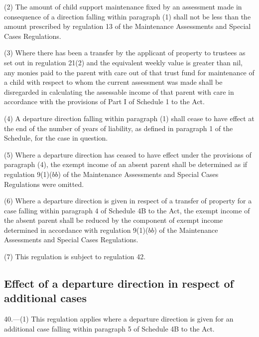 \documentclass[12pt,a4paper]{article}
\begin{document}
(2) The amount of child support maintenance fixed by an assessment made in
consequence of a direction falling within paragraph (1) shall not be less than
the amount prescribed by regulation 13 of the Maintenance Assessments and
Special Cases Regulations.

(3) Where there has been a transfer by the applicant of property to trustees as
set out in regulation 21(2) and the equivalent weekly value is greater than nil,
any monies paid to the parent with care out of that trust fund for maintenance
of a child with respect to whom the current assessment was made shall be
disregarded in calculating the assessable income of that parent with care in
accordance with the provisions of Part I of Schedule 1 to the Act.

(4) A departure direction falling within paragraph (1) shall cease to have
effect at the end of the number of years of liability, as defined in paragraph 1
of the Schedule, for the case in question.

(5) Where a departure direction has ceased to have effect under the provisions
of paragraph (4), the exempt income of an absent parent shall be determined as
if regulation 9(1)($bb$) of the Maintenance Assessments and Special Cases
Regulations were omitted.

(6) Where a departure direction is given in respect of a transfer of property
for a case falling within paragraph 4 of Schedule 4B to the Act, the exempt
income of the absent parent shall be reduced by the component of exempt income
determined in accordance with regulation 9(1)($bb$) of the Maintenance Assessments
and Special Cases Regulations.

(7) This regulation is subject to regulation 42.


\subsection[40. Effect of a departure direction in respect of additional cases]{Effect of a departure direction in respect of additional cases}

40.—(1) This
regulation applies where a departure direction is given for an additional case
falling within paragraph 5 of Schedule 4B to the Act.
\end{document}
